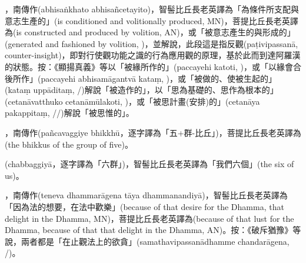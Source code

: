 \startitemgroup[noteitems]
\item{}，南傳作(abhisaṅkhato abhisañcetayito)，智髻比丘長老英譯為「為條件所支配與意志生產的」(is conditioned and volitionally produced, MN)，菩提比丘長老英譯為(is constructed and produced by volition, AN)，或「被意志產生的與形成的」(generated and fashioned by volition, )，並解說，此段這是指反觀(paṭivipassanā, counter-insight)，即對行使觀功能之識的行為應用觀的原理，基於此而到達阿羅漢的狀態。按：《顯揚真義》等以「被緣所作的」(paccayehi katoti, )，或「以緣會合後所作」(paccayehi abhisamāgantvā kataṃ, )，或「被做的、使被生起的」(kataṃ uppāditaṃ, /)解說「被造作的」，以「思為基礎的、思作為根本的」(cetanāvatthuko cetanāmūlakoti, )，或「被思計畫(安排)的」(cetanāya pakappitaṃ, //)解說「被思惟的」。
\stopitemgroup

\startitemgroup[noteitems]
\item{}，南傳作(pañcavaggiye bhikkhū，逐字譯為「五+群-比丘」)，菩提比丘長老英譯為(the bhikkus of the group of five)。
\item{}(chabbaggiyā，逐字譯為「六群」)，智髻比丘長老英譯為「我們六個」(the six of us)。
\stopitemgroup

\startitemgroup[noteitems]
\item{}，南傳作(teneva dhammarāgena tāya dhammanandiyā)，智髻比丘長老英譯為「因為法的想要，在法中歡樂」(because of that desire for the Dhamma, that delight in the Dhamma, MN)，菩提比丘長老英譯為(because of that lust for the Dhamma, because of that that delight in the Dhamma, AN)。按：《破斥猶豫》等說，兩者都是「在止觀法上的欲貪」(samathavipassanādhamme chandarāgena, /)。
\stopitemgroup

